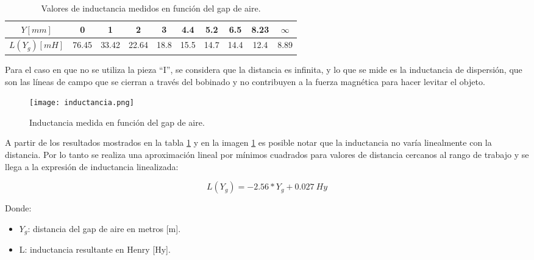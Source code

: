 \begin{table} [H]
	\begin{center}
		\begin{tabular}{| c | c | c | c | c | c | c | c | c | c |}
			\hline			
			$Y[mm]$ & 0 & 1 & 2 & 3 & 4.4 & 5.2 & 6.5 & 8.23 & $\infty$ \\ \hline
			$L(Y_{g})[mH]$ & 76.45 & 33.42 & 22.64 & 18.8 & 15.5 & 14.7 & 14.4 & 12.4 & 8.89\\ \hline
		\end{tabular}
		\caption{Valores de inductancia medidos en función del gap de aire.}
		\label{tab_mediciones_inductancia}
	\end{center}
\end{table}

\noindent Para el caso en que no se utiliza la pieza ``I'', se considera que la distancia es infinita, y lo que se mide es la inductancia de dispersión, que son las líneas de campo que se cierran a través del bobinado y no contribuyen a la fuerza magnética para hacer levitar el objeto.



\begin{figure} [H]
	\centering
	\texttt{[image: inductancia.png]}
	\caption{Inductancia medida en función del gap de aire.}
	\label{fig:img_inductancia_medida}
\end{figure}
\noindent A partir de los resultados mostrados en la tabla \ref{tab_mediciones_inductancia} y en la imagen \ref{fig:img_inductancia_medida} es posible notar que la inductancia no varía linealmente con la distancia. Por lo tanto se realiza una aproximación lineal por mínimos cuadrados para valores de distancia cercanos al rango de trabajo y se llega a la expresión de inductancia linealizada:

\begin{equation}
	\label{eq_induct_practica}
	L(Y_g)=-2.56*Y_{g}+0.027\:Hy
\end{equation}

\noindent Donde:
\begin{itemize}
	\item $Y_{g}$: distancia del gap de aire en metros [m].
	\item L: inductancia resultante en Henry [Hy].
\end{itemize}




